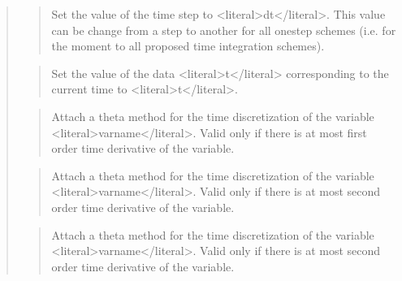 \documentclass[a4paper,11pt,english]{sphinxmanual}
\begin{document}
\begin{quote}
\begin{quote}
\sphinxAtStartPar
Set the value of the time step to \textless{}literal\textgreater{}dt\textless{}/literal\textgreater{}. This value can be change
from a step to another for all one\sphinxhyphen{}step schemes (i.e. for the moment
to all proposed time integration schemes).
\end{quote}

\sphinxAtStartPar
{}
\begin{quote}

\sphinxAtStartPar
Set the value of the data \textless{}literal\textgreater{}t\textless{}/literal\textgreater{} corresponding to the current time to \textless{}literal\textgreater{}t\textless{}/literal\textgreater{}.
\end{quote}

\sphinxAtStartPar
{}
\begin{quote}

\sphinxAtStartPar
Attach a theta method for the time discretization of the variable
\textless{}literal\textgreater{}varname\textless{}/literal\textgreater{}. Valid only if there is at most first order time derivative
of the variable.
\end{quote}

\sphinxAtStartPar
{}
\begin{quote}

\sphinxAtStartPar
Attach a theta method for the time discretization of the variable
\textless{}literal\textgreater{}varname\textless{}/literal\textgreater{}. Valid only if there is at most second order time derivative
of the variable.
\end{quote}

\sphinxAtStartPar
{}
\begin{quote}

\sphinxAtStartPar
Attach a theta method for the time discretization of the variable
\textless{}literal\textgreater{}varname\textless{}/literal\textgreater{}. Valid only if there is at most second order time derivative
of the variable.
\end{quote}


\end{quote}
\end{document}
